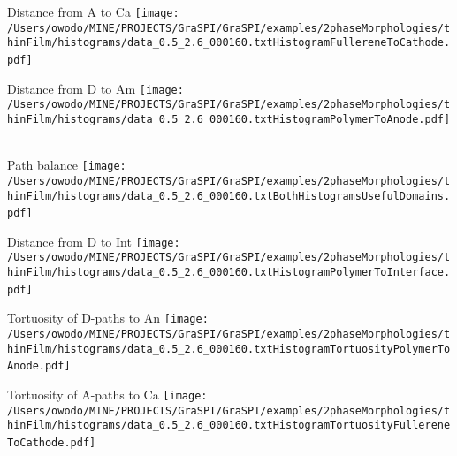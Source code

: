 \documentclass{article}
\begin{document}
\parbox{0.60\textwidth}{
\parbox{0.3\textwidth}{\centering Distance from A to Ca \newline
\texttt{[image: /Users/owodo/MINE/PROJECTS/GraSPI/GraSPI/examples/2phaseMorphologies/thinFilm/histograms/data\_0.5\_2.6\_000160.txtHistogramFullereneToCathode.pdf]} \ ~ \ } 
\parbox{0.3\textwidth}{\centering Distance from D to Am \newline
\texttt{[image: /Users/owodo/MINE/PROJECTS/GraSPI/GraSPI/examples/2phaseMorphologies/thinFilm/histograms/data\_0.5\_2.6\_000160.txtHistogramPolymerToAnode.pdf]} \ ~ \ }
\parbox{0.3\textwidth}{\centering Path balance \newline 
\texttt{[image: /Users/owodo/MINE/PROJECTS/GraSPI/GraSPI/examples/2phaseMorphologies/thinFilm/histograms/data\_0.5\_2.6\_000160.txtBothHistogramsUsefulDomains.pdf]} \ ~ \ }
\parbox{0.3\textwidth}{\centering Distance from D to Int \newline 
\texttt{[image: /Users/owodo/MINE/PROJECTS/GraSPI/GraSPI/examples/2phaseMorphologies/thinFilm/histograms/data\_0.5\_2.6\_000160.txtHistogramPolymerToInterface.pdf]} \ ~ \ }
\parbox{0.3\textwidth}{\centering Tortuosity of D-paths to An  \newline
\texttt{[image: /Users/owodo/MINE/PROJECTS/GraSPI/GraSPI/examples/2phaseMorphologies/thinFilm/histograms/data\_0.5\_2.6\_000160.txtHistogramTortuosityPolymerToAnode.pdf]} \ ~ \ }
\parbox{0.3\textwidth}{\centering Tortuosity of A-paths to Ca \newline
\texttt{[image: /Users/owodo/MINE/PROJECTS/GraSPI/GraSPI/examples/2phaseMorphologies/thinFilm/histograms/data\_0.5\_2.6\_000160.txtHistogramTortuosityFullereneToCathode.pdf]} \ ~ \ }
}
\newpage
\end{document}
